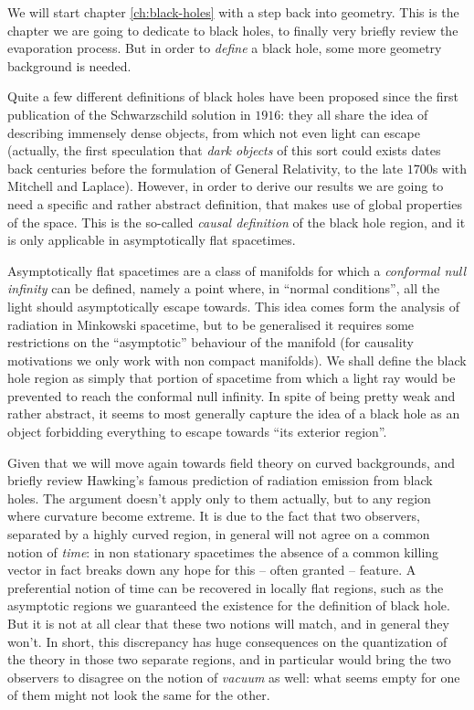 We will start chapter \ref{ch:black-holes} with a step back into geometry. This is the chapter we are going to dedicate to black holes, to finally very briefly review the evaporation process. But in order to \emph{define} a black hole, some more geometry background is needed. 

Quite a few different definitions of black holes have been proposed since the first publication of the Schwarzschild solution in \(1916\): they all share the idea of describing immensely dense objects, from which not even light can escape (actually, the first speculation that \emph{dark objects} of this sort could exists dates back centuries before the formulation of General Relativity, to the late \(1700\)s with Mitchell and Laplace). However, in order to derive our results we are going to need a specific and rather abstract definition, that makes use of global properties of the space. This is the so-called \emph{causal definition} of the black hole region, and it is only applicable in asymptotically flat spacetimes.

Asymptotically flat spacetimes are a class of manifolds for which a \emph{conformal null infinity} can be defined, namely a point where, in ``normal conditions'', all the light should asymptotically escape towards. This idea comes form the analysis of radiation in Minkowski spacetime, but to be generalised it requires some restrictions on the ``asymptotic'' behaviour of the manifold (for causality motivations we only work with non compact manifolds). We shall define the black hole region as simply that portion of spacetime from which a light ray would be prevented to reach the conformal null infinity. In spite of being pretty weak and rather abstract, it seems to most generally capture the idea of a black hole as an object forbidding everything to escape towards ``its exterior region''.

Given that we will move again towards field theory on curved backgrounds, and briefly review Hawking's famous prediction of radiation emission from black holes. The argument doesn't apply only to them actually, but to any region where curvature become extreme. It is due to the fact that two observers, separated by a highly curved region, in general will not agree on a common notion of \emph{time}: in non stationary spacetimes the absence of a common killing vector in fact breaks down any hope for this -- often granted -- feature. A preferential notion of time can be recovered in locally flat regions, such as the asymptotic regions we guaranteed the existence for the definition of black hole. But it is not at all clear that these two notions will match, and in general they won't. In short, this discrepancy has huge consequences on the quantization of the theory in those two separate regions, and in particular would bring the two observers to disagree on the notion of \emph{vacuum} as well: what seems empty for one of them might not look the same for the other. 

